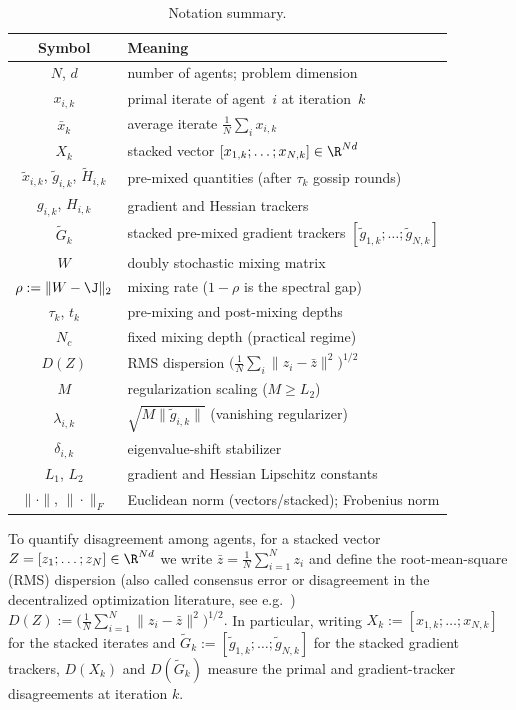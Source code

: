 \documentclass[review,onefignum,onetabnum]{siamart171218}
\begin{document}
	\begin{table}[htbp]
		\centering
		\caption{Notation summary.}
		\label{tab:notation}
		\setlength{\tabcolsep}{4pt}
		\small
		\begin{tabular}{cl}
			\toprule
			Symbol & Meaning \\
			\midrule
			$N$, $d$ & number of agents; problem dimension \\
			$x_{i,k}$ & primal iterate of agent~$i$ at iteration~$k$ \\
			$\bar x_k$ & average iterate $\frac1N\sum_i x_{i,k}$ \\
			$X_k$ & stacked vector $[x_{1,k};\dots;x_{N,k}]\in\R^{Nd}$ \\
			$\tilde x_{i,k}$, $\tilde g_{i,k}$, $\tilde H_{i,k}$ & pre-mixed quantities (after $\tau_k$ gossip rounds) \\
			$g_{i,k}$, $H_{i,k}$ & gradient and Hessian trackers \\
			$\tilde G_k$ & stacked pre-mixed gradient trackers $[\tilde g_{1,k};\dots;\tilde g_{N,k}]$ \\
			$W$ & doubly stochastic mixing matrix \\
			$\rho:=\|W-\J\|_2$ & mixing rate ($1{-}\rho$ is the spectral gap) \\
			$\tau_k$, $t_k$ & pre-mixing and post-mixing depths \\
			$N_c$ & fixed mixing depth (practical regime) \\
			$D(Z)$ & RMS dispersion $\bigl(\frac1N\sum_i\|z_i-\bar z\|^2\bigr)^{1/2}$ \\
			$M$ & regularization scaling ($M\ge L_2$) \\
			$\lambda_{i,k}$ & $\sqrt{M\|\tilde g_{i,k}\|}$ (vanishing regularizer) \\
			$\delta_{i,k}$ & eigenvalue-shift stabilizer \\
			$L_1$, $L_2$ & gradient and Hessian Lipschitz constants \\
			$\|\cdot\|$, $\|\cdot\|_F$ & Euclidean norm (vectors/stacked); Frobenius norm \\
			\bottomrule
		\end{tabular}
	\end{table}
	
	To quantify disagreement among agents, for a stacked vector $Z=[z_1;\dots;z_N]\in\R^{Nd}$
	we write $\bar z=\frac1N\sum_{i=1}^N z_i$ and define the root-mean-square (RMS) dispersion
	(also called consensus error or disagreement in the
	decentralized optimization literature, see e.g.\
	\citet{nedic2009subgradient,nedic2017diging})
	\(
	  D(Z):=\bigl(\tfrac1N\sum_{i=1}^N\|z_i-\bar z\|^2\bigr)^{1/2}.
	\)
	In particular, writing $X_k:=[x_{1,k};\dots;x_{N,k}]$ for the stacked iterates and
	$\tilde G_k:=[\tilde g_{1,k};\dots;\tilde g_{N,k}]$ for the stacked gradient trackers,
	$D(X_k)$ and $D(\tilde G_k)$ measure the primal and gradient-tracker disagreements at iteration $k$.
\end{document}
